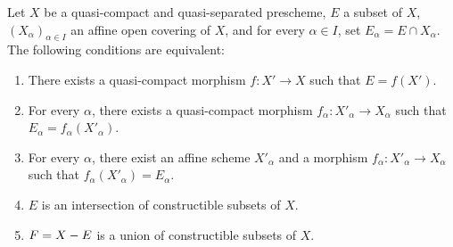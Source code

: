 \begin{proposition}[1.9.3]
\label{IV.1.9.3}
Let $X$ be a quasi-compact and quasi-separated prescheme, $E$ a subset of
$X$, $(X_\alpha)_{\alpha\in I}$ an affine open covering of $X$, and for
every $\alpha\in I$, set $E_\alpha=E\cap X_\alpha$. The following conditions
are equivalent:
\begin{enumerate}
  \item[\textup{a)}] There exists a quasi-compact morphism $f:X'\to X$ such that
  $E=f(X')$.
  \item[\textup{a$'$)}] For every $\alpha$, there exists a quasi-compact morphism
  $f_\alpha:X'_\alpha\to X_\alpha$ such that
  $E_\alpha=f_\alpha(X'_\alpha)$.
  \item[\textup{a$''$)}] For every $\alpha$, there exist an affine scheme $X'_\alpha$
  and a morphism $f_\alpha:X'_\alpha\to X_\alpha$ such that
  $f_\alpha(X'_\alpha)=E_\alpha$.
  \item[\textup{b)}] $E$ is an intersection of constructible subsets of $X$.
  \item[\textup{b$'$)}] $F=X- E$ is a union of constructible subsets of $X$.
\end{enumerate}
\end{proposition}

